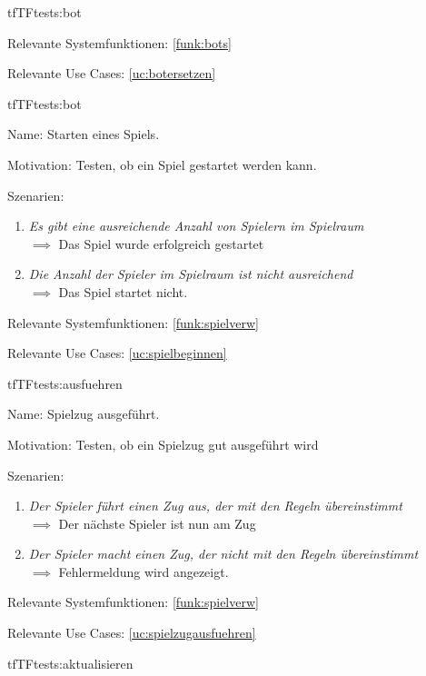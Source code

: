\begin{description}[leftmargin=5em, style=sameline]
\begin{lhp}{tf}{TF}{tests:bot}
\begin{enumerate}
		\end{enumerate}
	\item [Relevante Systemfunktionen:] \ref{funk:bots}
	\item [Relevante Use Cases:] \ref{uc:botersetzen}
\end{lhp}
\begin{lhp}{tf}{TF}{tests:bot}
	\item [Name:]Starten eines Spiels.
	\item [Motivation:] Testen, ob ein Spiel gestartet werden kann. 
	\item [Szenarien:] \hfill
		\begin{enumerate}
        \item \textit{Es gibt eine ausreichende Anzahl von Spielern im Spielraum} \\ $\implies$ Das Spiel wurde erfolgreich gestartet
            \item \textit{Die Anzahl der Spieler im Spielraum ist nicht ausreichend} \\ $\implies$  Das Spiel startet nicht.
		\end{enumerate}
	\item [Relevante Systemfunktionen:] \ref{funk:spielverw}
	\item [Relevante Use Cases:] \ref{uc:spielbeginnen}
\end{lhp}
\begin{lhp}{tf}{TF}{tests:ausfuehren}
	\item [Name:] Spielzug ausgeführt.
	\item [Motivation:] Testen, ob ein Spielzug gut ausgeführt wird 
	\item [Szenarien:] \hfill
		\begin{enumerate}
        \item \textit{Der Spieler führt einen Zug aus, der mit den Regeln übereinstimmt} \\ $\implies$ Der nächste Spieler ist nun am Zug
            \item \textit{Der Spieler macht einen Zug, der nicht mit den Regeln übereinstimmt} \\ $\implies$  Fehlermeldung wird angezeigt.
            \end{enumerate}
	\item [Relevante Systemfunktionen:] \ref{funk:spielverw}
	\item [Relevante Use Cases:] \ref{uc:spielzugausfuehren}
\end{lhp}
\begin{lhp}{tf}{TF}{tests:aktualisieren}

\end{lhp}
\end{description}
